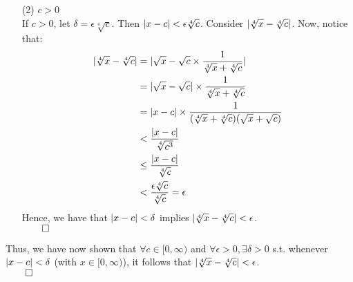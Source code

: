 \documentclass[11pt]{article}
\DeclarePairedDelimiter\abs{\lvert}{\rvert}%
\begin{document}
\begin{itemize}
\begin{itemize}
            \item[(2)]
                $c > 0$\\
                If $c > 0$, let $\delta = \epsilon\sqrt[4]{c}$. Then
                $\abs{x - c} < \epsilon\sqrt[4]{c}$.
                Consider $\abs{\sqrt[4]{x} - \sqrt[4]{c}}$. Now, notice that:
                \begin{align*}
                    \abs{\sqrt[4]{x} - \sqrt[4]{c}} &= \abs{\sqrt{x} - \sqrt{c} \times \dfrac{1}{\sqrt[4]{x} + \sqrt[4]{c}}}\\
                                                    &= \abs{\sqrt{x} - \sqrt{c}} \times \dfrac{1}{\sqrt[4]{x} + \sqrt[4]{c}}\\
                                                    &= \abs{x - c} \times \dfrac{1}{(\sqrt[4]{x} + \sqrt[4]{c})(\sqrt{x} + \sqrt{c})}\\
                                                    &< \dfrac{\abs{x - c}}{\sqrt[4]{c^3}}\\
                                                    &\leq \dfrac{\abs{x - c}}{\sqrt[4]{c}}\\
                                                    &< \dfrac{\epsilon\sqrt[4]{c}}{\sqrt[4]{c}} = \epsilon
                \end{align*}
                Hence, we have that $\abs{x - c} < \delta$ implies
                $\abs{\sqrt[4]{x} - \sqrt[4]{c}} < \epsilon$.\\
                $\qed$
        \end{itemize}

        Thus, we have now shown that $\forall c \in [0, \infty)$ and
        $\forall \epsilon > 0, \exists \delta > 0$ s.t. whenever
        $\abs{x - c} < \delta$ (with $x \in [0, \infty)$), it follows that
        $\abs{\sqrt[4]{x} - \sqrt[4]{c}} < \epsilon$.\\
        $\qed$

    \newpage


\end{itemize}
\end{document}
